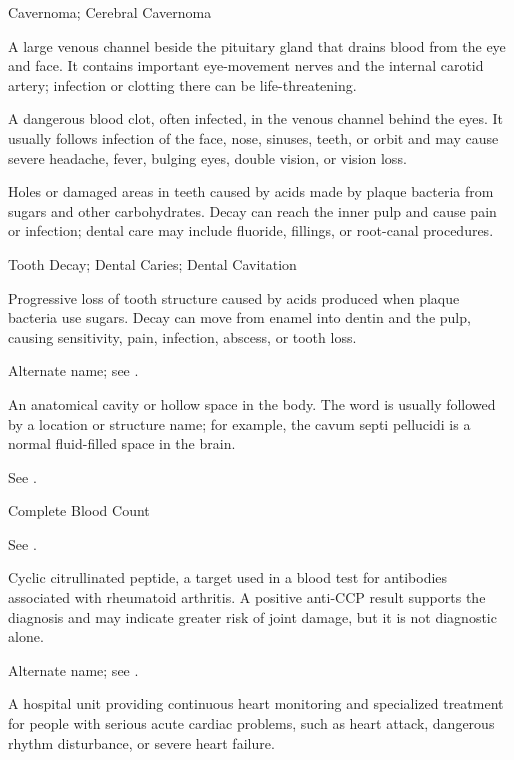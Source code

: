 \synonyms
Cavernoma; Cerebral Cavernoma

 A large venous channel beside the pituitary gland that drains blood from the eye and face. It contains important eye-movement nerves and the internal carotid artery; infection or clotting there can be life-threatening.

 A dangerous blood clot, often infected, in the venous channel behind the eyes. It usually follows infection of the face, nose, sinuses, teeth, or orbit and may cause severe headache, fever, bulging eyes, double vision, or vision loss.

 Holes or damaged areas in teeth caused by acids made by plaque bacteria from sugars and other carbohydrates. Decay can reach the inner pulp and cause pain or infection; dental care may include fluoride, fillings, or root-canal procedures.

\synonyms
Tooth Decay; Dental Caries; Dental Cavitation

 Progressive loss of tooth structure caused by acids produced when plaque bacteria use sugars. Decay can move from enamel into dentin and the pulp, causing sensitivity, pain, infection, abscess, or tooth loss.

 Alternate name; see .

 An anatomical cavity or hollow space in the body. The word is usually followed by a location or structure name; for example, the cavum septi pellucidi is a normal fluid-filled space in the brain.

 See .

\synonyms
Complete Blood Count

 See .

 Cyclic citrullinated peptide, a target used in a blood test for antibodies associated with rheumatoid arthritis. A positive anti-CCP result supports the diagnosis and may indicate greater risk of joint damage, but it is not diagnostic alone.

 Alternate name; see .

 A hospital unit providing continuous heart monitoring and specialized treatment for people with serious acute cardiac problems, such as heart attack, dangerous rhythm disturbance, or severe heart failure.

